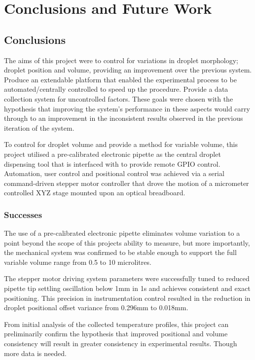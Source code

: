 \chapter{Conclusions and Future Work}\label{C:conclusion}

\section{Conclusions}

The aims of this project were to control for variations in droplet morphology; droplet position and volume, providing an improvement over the previous system. Produce an extendable platform that enabled the experimental process to be automated/centrally controlled to speed up the procedure. Provide a data collection system for uncontrolled factors. 
These goals were chosen with the hypothesis that improving the system's performance in these aspects would carry through to an improvement in the inconsistent results observed in the previous iteration of the system.  

To control for droplet volume and provide a method for variable volume, this project utilised a pre-calibrated electronic pipette as the central droplet dispensing tool that is interfaced with to provide remote GPIO control. Automation, user control and positional control was achieved via a serial command-driven stepper motor controller that drove the motion of a micrometer controlled XYZ stage mounted upon an optical breadboard.   

\subsection*{Successes}
The use of a pre-calibrated electronic pipette eliminates volume variation to a point beyond the scope of this projects ability to measure, but more importantly, the mechanical system was confirmed to be stable enough to support the full variable volume range from 0.5 to 10 microlitres.

The stepper motor driving system parameters were successfully tuned to reduced pipette tip settling oscillation below 1mm in 1s and achieves consistent and exact positioning. This precision in instrumentation control resulted in the reduction in droplet positional offset  variance from 0.296mm to 0.018mm.

From initial analysis of the collected temperature profiles, this project can preliminarily confirm the hypothesis that improved positional and volume consistency will result in greater consistency in experimental results. Though more data is needed.

